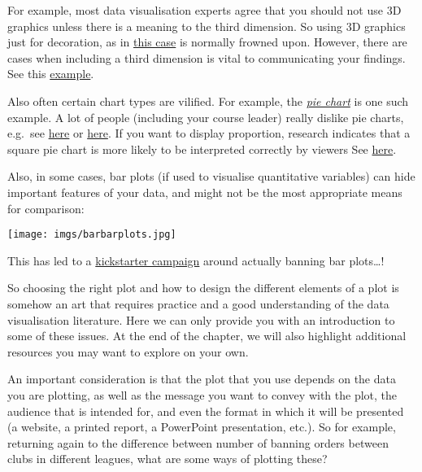 \documentclass[
]{book}
\begin{document}
For example, most data visualisation experts agree that you should not use 3D graphics unless there is a meaning to the third dimension. So using 3D graphics just for decoration, as in \href{https://mir-s3-cdn-cf.behance.net/project_modules/disp/2505dd10837923.56030acd2ef20.jpg}{this case} is normally frowned upon. However, there are cases when including a third dimension is vital to communicating your findings. See this \href{http://www.visualisingdata.com/2015/03/when-3d-works/}{example}.

Also often certain chart types are vilified. For example, the \href{https://en.wikipedia.org/wiki/Pie_chart}{\emph{pie chart}} is one such example. A lot of people (including your course leader) really dislike pie charts, e.g.~see \href{http://www.storytellingwithdata.com/blog/2011/07/death-to-pie-charts}{here} or \href{http://www.businessinsider.com/pie-charts-are-the-worst-2013-6?IR=T}{here}. If you want to display proportion, research indicates that a square pie chart is more likely to be interpreted correctly by viewers See \href{https://eagereyes.org/blog/2016/a-reanalysis-of-a-study-about-square-pie-charts-from-2009}{here}.

Also, in some cases, bar plots (if used to visualise quantitative variables) can hide important features of your data, and might not be the most appropriate means for comparison:

\texttt{[image: imgs/barbarplots.jpg]}

This has led to a \href{https://www.kickstarter.com/projects/1474588473/barbarplots/description}{kickstarter campaign} around actually banning bar plots\ldots!

So choosing the right plot and how to design the different elements of a plot is somehow an art that requires practice and a good understanding of the data visualisation literature. Here we can only provide you with an introduction to some of these issues. At the end of the chapter, we will also highlight additional resources you may want to explore on your own.

An important consideration is that the plot that you use depends on the data you are plotting, as well as the message you want to convey with the plot, the audience that is intended for, and even the format in which it will be presented (a website, a printed report, a PowerPoint presentation, etc.). So for example, returning again to the difference between number of banning orders between clubs in different leagues, what are some ways of plotting these?
\end{document}
